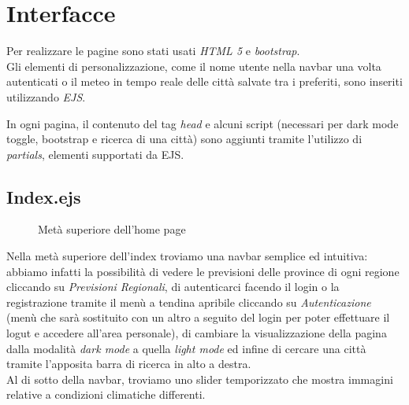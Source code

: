 \chapter{Interfacce}

Per realizzare le pagine sono stati usati \emph{HTML 5} e \emph{bootstrap}.\\ 
Gli elementi di personalizzazione, come il nome utente nella navbar una volta autenticati o il meteo 
in tempo reale delle città salvate tra i preferiti, sono inseriti utilizzando \emph{EJS}.

\vspace{5mm}

In ogni pagina, il contenuto del tag \emph{head} e alcuni script (necessari per dark mode toggle, bootstrap e 
ricerca di una città) sono aggiunti tramite l'utilizzo di \emph{partials}, elementi supportati da EJS.

\section{Index.ejs}

\begin{figure}[ht]
    \centering
    \caption{Metà superiore dell'home page}
\end{figure}

Nella metà superiore dell'index troviamo una navbar semplice ed intuitiva: abbiamo infatti la 
possibilità di vedere le previsioni delle province di ogni regione cliccando su 
\emph{Previsioni Regionali}, di autenticarci facendo il login o la registrazione tramite il menù a 
tendina apribile cliccando su \emph{Autenticazione} (menù che sarà sostituito con un altro  
a seguito del login per poter effettuare il logut e accedere all'area personale), di cambiare la visualizzazione 
della pagina dalla modalità \emph{dark mode} a quella \emph{light mode} ed infine di cercare una città tramite 
l'apposita barra di ricerca in alto a destra.\\ 
Al di sotto della navbar, troviamo uno slider temporizzato che mostra immagini relative a condizioni 
climatiche differenti. 

